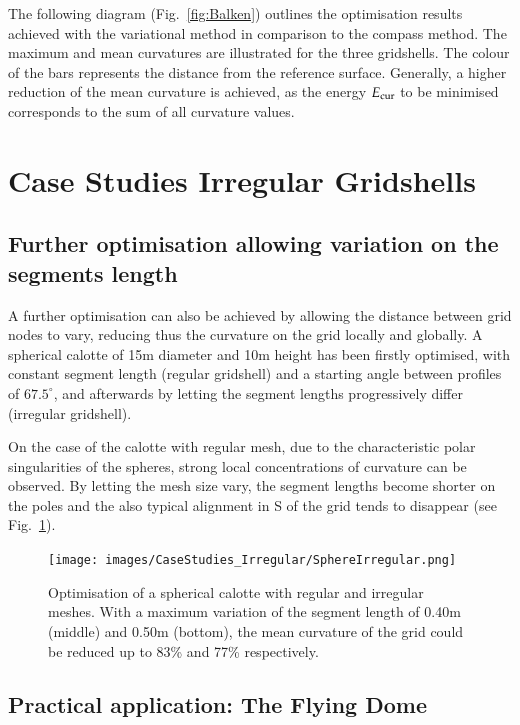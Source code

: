 \documentclass[Thesis.tex]{subfiles}
\begin{document}
The following diagram  (Fig.~\ref{fig:Balken}) outlines the optimisation results achieved with the variational method in comparison to the compass method. The maximum and mean curvatures are illustrated for the three gridshells. The colour of the bars represents the distance from the reference surface. Generally, a higher reduction of the mean curvature is achieved, as the energy $E_{\textrm{\scriptsize{cur}}}$ to be minimised corresponds to the sum of all curvature values.

\section{Case Studies Irregular Gridshells}

\subsection{Further optimisation allowing variation on the segments length}

A further optimisation can also be achieved by allowing the distance between grid nodes to vary, reducing thus the curvature on the grid locally and globally. A spherical calotte of 15m diameter and 10m height has been firstly optimised, with constant segment length (regular gridshell) and a starting angle between profiles of $67.5^\circ$, and afterwards  by letting the segment lengths progressively differ (irregular gridshell). 

On the case of the calotte with regular mesh, due to the characteristic polar singularities of the spheres, strong local concentrations of curvature can be observed. By letting the mesh size vary, the segment lengths become shorter on the poles and the also typical alignment in S of the grid tends to disappear (see Fig.~\ref{fig:SphereIrregular}).

\begin{figure}
\centering
\texttt{[image: images/CaseStudies\_Irregular/SphereIrregular.png]}
\caption{Optimisation of a spherical calotte with regular and irregular meshes. With a maximum variation of the segment length of 0.40m (middle) and 0.50m (bottom), the mean curvature of the grid could be reduced up to 83\% and 77\% respectively.}
\label{fig:SphereIrregular}
\end{figure}

\subsection{Practical application: The Flying Dome}
\end{document}
